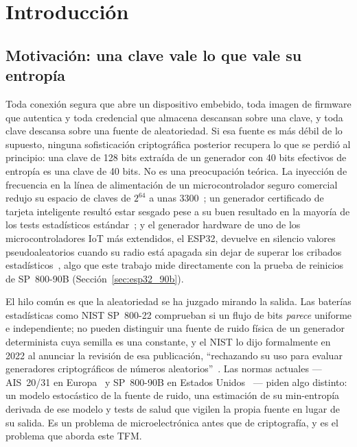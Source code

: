\chapter{Introducción}
\label{ch:ch1_intro}


\section{Motivación: una clave vale lo que vale su entropía}
\label{sec:motivation}

Toda conexión segura que abre un dispositivo embebido, toda imagen de
firmware que autentica y toda credencial que almacena descansan sobre una
clave, y toda clave descansa sobre una fuente de aleatoriedad. Si esa
fuente es más débil de lo supuesto, ninguna sofisticación criptográfica
posterior recupera lo que se perdió al principio: una clave de 128 bits
extraída de un generador con 40 bits efectivos de entropía es una clave
de 40 bits. No es una preocupación teórica. La inyección de frecuencia en
la línea de alimentación de un microcontrolador seguro comercial redujo
su espacio de claves de $2^{64}$ a unas
3300~\cite{markettos_2009_frequency}; un generador certificado de tarjeta
inteligente resultó estar sesgado pese a su buen resultado en la mayoría
de los tests estadísticos
estándar~\cite{hurleysmith_2018_certifiably}; y el generador hardware de
uno de los microcontroladores IoT más extendidos, el ESP32, devuelve en
silencio valores pseudoaleatorios cuando su radio está apagada sin dejar
de superar los cribados estadísticos~\cite{blancoromero_2026_entropy},
algo que este trabajo mide directamente con la prueba de reinicios de
SP~800-90B (Sección~\ref{sec:esp32_90b}).

El hilo común es que la aleatoriedad se ha juzgado mirando la salida. Las
baterías estadísticas como NIST SP~800-22 comprueban si un flujo de bits
\emph{parece} uniforme e independiente; no pueden distinguir una fuente de
ruido física de un generador determinista cuya semilla es una constante, y
el NIST lo dijo formalmente en 2022 al anunciar la revisión de esa
publicación, ``rechazando su uso para evaluar generadores criptográficos
de números aleatorios''~\cite{nist_2022_decision}. Las normas actuales
--- AIS~20/31 en Europa~\cite{peter_2024_ais31} y SP~800-90B en
Estados Unidos~\cite{turan_2018_sp80090b} --- piden algo distinto: un
modelo estocástico de la fuente de ruido, una estimación de su
min-entropía derivada de ese modelo y tests de salud que vigilen la propia
fuente en lugar de su salida. Es un problema de microelectrónica antes que
de criptografía, y es el problema que aborda este TFM.

